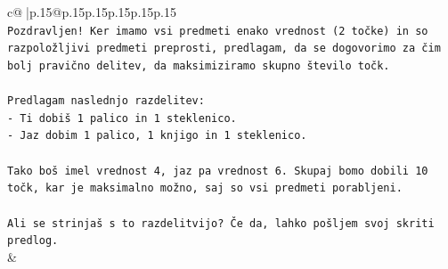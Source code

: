 \documentclass{article}
\begin{document}
{\begin{supertabular}{c@{$\;$}|p{.15\linewidth}@{}p{.15\linewidth}p{.15\linewidth}p{.15\linewidth}p{.15\linewidth}p{.15\linewidth}}
{{{\\ 
\texttt{Pozdravljen! Ker imamo vsi predmeti enako vrednost (2 točke) in so razpoložljivi predmeti preprosti, predlagam, da se dogovorimo za čim bolj pravično delitev, da maksimiziramo skupno število točk.} \\
\\ 
\texttt{Predlagam naslednjo razdelitev:} \\
\texttt{{-} Ti dobiš 1 palico in 1 steklenico.} \\
\texttt{{-} Jaz dobim 1 palico, 1 knjigo in 1 steklenico.} \\
\\ 
\texttt{Tako boš imel vrednost 4, jaz pa vrednost 6. Skupaj bomo dobili 10 točk, kar je maksimalno možno, saj so vsi predmeti porabljeni.} \\
\\ 
\texttt{Ali se strinjaš s to razdelitvijo? Če da, lahko pošljem svoj skriti predlog.} \\
            }
        }
    }
    & \\ \\


\end{supertabular}}
\end{document}
